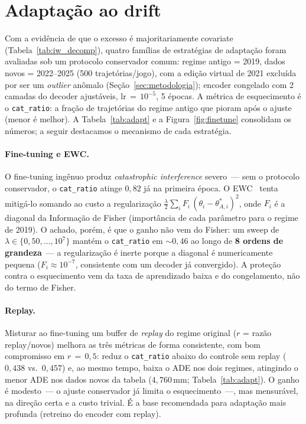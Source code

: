 \documentclass[runningheads]{llncs}
\begin{document}
\section{Adapta\c{c}\~ao ao drift}
\label{sec:adaptacao}

Com a evid\^encia de que o excesso \'e majoritariamente covariate (Tabela~\ref{tab:iw_decomp}), quatro fam\'ilias de estrat\'egias de adapta\c{c}\~ao foram avaliadas sob um protocolo conservador comum: regime antigo = 2019, dados novos = 2022--2025 (500 trajet\'orias/jogo), com a edi\c{c}\~ao virtual de 2021 exclu\'ida por ser um \emph{outlier} an\^omalo (Se\c{c}\~ao~\ref{sec:metodologia}); encoder congelado com 2 camadas do decoder ajust\'aveis, $\mathrm{lr}\,{=}\,10^{-5}$, 5 \'epocas. A m\'etrica de esquecimento \'e o \texttt{cat\_ratio}: a fra\c{c}\~ao de trajet\'orias do regime antigo que pioram ap\'os o ajuste (menor \'e melhor). A Tabela~\ref{tab:adapt} e a Figura~\ref{fig:finetune} consolidam os n\'umeros; a seguir destacamos o mecanismo de cada estrat\'egia.

\paragraph{Fine-tuning e EWC.}
O fine-tuning ing\^enuo produz \emph{catastrophic interference} severo~--- sem o protocolo conservador, o \texttt{cat\_ratio} atinge $0{,}82$ j\'a na primeira \'epoca. O EWC~\cite{kirkpatrick2017} tenta mitig\'a-lo somando ao custo a regulariza\c{c}\~ao $\frac{\lambda}{2}\sum_i F_i\,(\theta_i - \theta^*_{A,i})^2$, onde $F_i$ \'e a diagonal da Informa\c{c}\~ao de Fisher (import\^ancia de cada par\^ametro para o regime de 2019). O achado, por\'em, \'e que o ganho n\~ao vem do Fisher: um sweep de $\lambda \in \{0, 50, \ldots, 10^7\}$ mant\'em o \texttt{cat\_ratio} em ${\sim}0{,}46$ ao longo de \textbf{8 ordens de grandeza}~--- a regulariza\c{c}\~ao \'e inerte porque a diagonal \'e numericamente pequena ($F_i \approx 10^{-7}$, consistente com um decoder j\'a convergido). A prote\c{c}\~ao contra o esquecimento vem da taxa de aprendizado baixa e do congelamento, n\~ao do termo de Fisher.

\paragraph{Replay.}
Misturar ao fine-tuning um buffer de \emph{replay} do regime original ($r$ = raz\~ao replay/novos) melhora as tr\^es m\'etricas de forma consistente, com bom compromisso em $r\,{=}\,0{,}5$: reduz o \texttt{cat\_ratio} abaixo do controle sem replay ($0{,}438$ vs.\ $0{,}457$) e, ao mesmo tempo, baixa o ADE nos dois regimes, atingindo o menor ADE nos dados novos da tabela ($4{,}760$\,mm; Tabela~\ref{tab:adapt}). O ganho \'e modesto~--- o ajuste conservador j\'a limita o esquecimento~---, mas mensur\'avel, na dire\c{c}\~ao certa e a custo trivial. \'E a base recomendada para adapta\c{c}\~ao mais profunda (retreino do encoder com replay).
\end{document}
